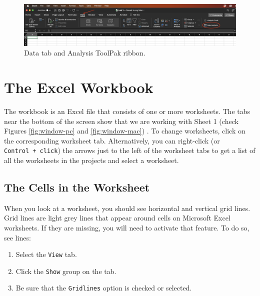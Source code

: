 \documentclass[
]{book}
\providecommand{\tightlist}{%
  \setlength{\itemsep}{0pt}\setlength{\parskip}{0pt}}
\begin{document}
\begin{figure}

{\centering \includegraphics[width=0.9\linewidth]{check_toolpak_mac} 

}

\caption{Data tab and Analysis ToolPak ribbon.}\label{fig:check-toolpak-mac}
\end{figure}

\hypertarget{workbook}{%
\section{The Excel Workbook}\label{workbook}}

The workbook is an Excel file that consists of one or more worksheets. The tabs near the bottom of the screen show that we are working with Sheet 1 (check Figures \ref{fig:window-pc} and \ref{fig:window-mac}) . To change worksheets, click on the corresponding worksheet tab. Alternatively, you can right-click (or \texttt{Control\ +\ click}) the arrows just to the left of the worksheet tabs to get a list of all the worksheets in the projects and select a worksheet.

\hypertarget{the-cells-in-the-worksheet}{%
\subsection{The Cells in the Worksheet}\label{the-cells-in-the-worksheet}}

When you look at a worksheet, you should see horizontal and vertical grid lines. Grid lines are light grey lines that appear around cells on Microsoft Excel worksheets. If they are missing, you will need to activate that feature. To do so, see lines:

\begin{enumerate}
\def\labelenumi{\arabic{enumi}.}
\tightlist
\item
  Select the \texttt{View} tab.
\item
  Click the \texttt{Show} group on the tab.
\item
  Be sure that the \texttt{Gridlines} option is checked or selected.
\end{enumerate}
\end{document}
